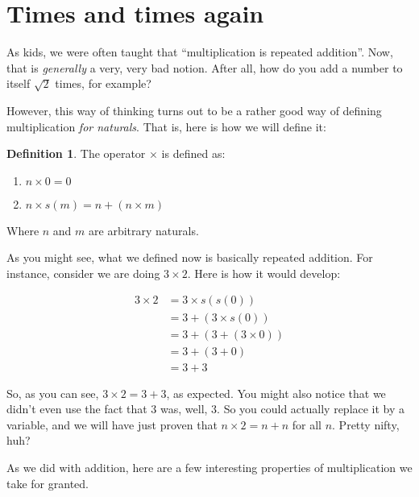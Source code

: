 \documentclass[12pt,a4paper]{article}
\theoremstyle{definition}
\newtheorem{definition}{Definition}
\theoremstyle{definition}
\theoremstyle{plain}
\theoremstyle{plain}
\begin{document}
	\section{Times and times again}
	
	As kids, we were often taught that ``multiplication is repeated addition''. Now, that is \emph{generally} a very, very bad notion. After all, how do you add a number to itself $\sqrt{2}$ times, for example?
	
	However, this way of thinking turns out to be a rather good way of defining multiplication \emph{for naturals}. That is, here is how we will define it:
	
	\begin{definition}
		The operator $\times$ is defined as:
		
		\begin{enumerate}
			\item $n \times 0 = 0$
			\item $n \times s(m) = n + (n \times m)$
		\end{enumerate}
		
		Where $n$ and $m$ are arbitrary naturals.
	\end{definition}
	
	As you might see, what we defined now is basically repeated addition. For instance, consider we are doing $3 \times 2$. Here is how it would develop:
	
	\begin{align*}
		3 \times 2 &= 3 \times s(s(0)) \\
				   &= 3 + (3 \times s(0)) \\
				   &= 3 + (3 + (3 \times 0)) \\ 
				   &= 3 + (3 + 0) \\
				   &= 3 + 3
	\end{align*}
	
	So, as you can see, $3 \times 2 = 3 + 3$, as expected. You might also notice that we didn't even use the fact that $3$ was, well, $3$. So you could actually replace it by a variable, and we will have just proven that $n \times 2 = n + n$ for all $n$. Pretty nifty, huh?
	
	As we did with addition, here are a few interesting properties of multiplication we take for granted.
	
\end{document}
